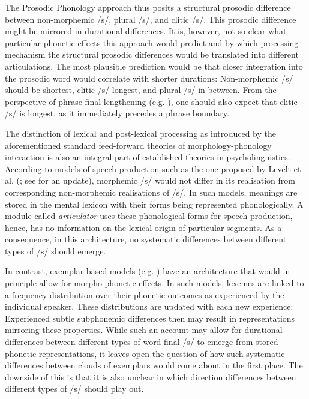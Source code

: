 The Prosodic Phonology approach thus posits a structural prosodic difference between non-morphemic /s/, plural /s/, and clitic /s/. This prosodic difference might be mirrored in durational differences. It is, however, not so clear what particular phonetic effects this approach would predict and by which processing mechanism the structural prosodic differences would be translated into different articulations. The most plausible prediction would be that closer integration into the prosodic word would correlate with shorter durations: Non-morphemic /s/ should be shortest, clitic /s/ longest, and plural /s/ in between. From the perspective of phrase-final lengthening (e.g. \cite{Klatt1976, Wightman1992}), one should also expect that clitic /s/ is longest, as it immediately precedes a phrase boundary.

The distinction of lexical and post-lexical processing as introduced by the aforementioned standard feed-forward theories of morphology-phonology interaction is also an integral part of established theories in psycholinguistics. According to models of speech production such as the one proposed by Levelt et al. (\cite{Levelt1999}; see \cite{Roelofs2019} for an update), morphemic /s/ would not differ in its realisation from corresponding non-morphemic realisations of /s/. In such models, meanings are stored in the mental lexicon with their forms being represented phonologically. A module called \textit{articulator} uses these phonological forms for speech production, hence, has no information on the lexical origin of particular segments. As a consequence, in this architecture, no systematic differences between different types of /s/ should emerge.

In contrast, exemplar-based models (e.g. \cite{Goldinger1998, Bybee2001, Pierrehumbert2001, Pierrehumbert2002, Gahl2006}) have an architecture that would in principle allow for morpho-phonetic effects. In such models, lexemes are linked to a frequency distribution over their phonetic outcomes as experienced by the individual speaker. These distributions are updated with each new experience: Experienced subtle subphonemic differences then may result in representations mirroring these properties. While such an account may allow for durational differences between different types of word-final /s/ to emerge from stored phonetic representations, it leaves open the question of how such systematic differences between clouds of exemplars would come about in the first place. The downside of this is that it is also unclear in which direction differences between different types of /s/ should play out.

